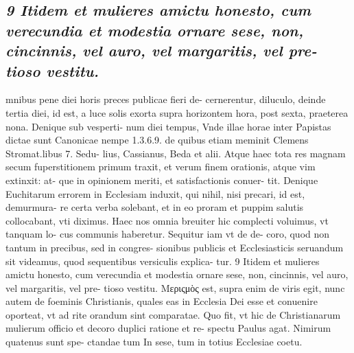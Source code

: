 \documentclass{article}
\begin{document}
\begin{pages}
\subsection*{\textit{9 Itidem et mulieres amictu honesto, cum verecundia et modestia ornare sese, non, cincinnis, vel auro, vel margaritis, vel pre- tioso vestitu.}}mnibus pene diei horis preces publicae fieri de- cernerentur, diluculo, deinde tertia diei, id est, a luce solis exorta supra horizontem hora, post sexta, praeterea nona. Denique sub vesperti- num diei tempus, Vnde illae horae inter Papistas dictae sunt Canonicae nempe 1.3.6.9. de quibus etiam meminit Clemens Stromat.libus 7. Sedu- lius, Cassianus, Beda et alii. Atque haec tota res magnam secum fuperstitionem primum traxit, et verum finem orationis, atque vim extinxit: at- que in opinionem meriti, et satisfactionis conuer- tit. Denique Euchitarum errorem in Ecclesiam induxit, qui nihil, nisi precari, id est, demurmura- re certa verba solebant, et in eo proram et puppim salutis collocabant, vti diximus. Haec nos omnia breuiter hic complecti voluimus, vt tanquam lo- cus communis haberetur. Sequitur iam vt de de- coro, quod non tantum in precibus, sed in congres- sionibus publicis et Ecclesiasticis seruandum sit videamus, quod sequentibus versiculis explica- tur. 9 Itidem et mulieres amictu honesto, cum verecundia et modestia ornare sese, non, cincinnis, vel auro, vel margaritis, vel pre- tioso vestitu. Μεριςμὸς est, supra enim de viris egit, nunc autem de foeminis Christianis, quales eas in Ecclesia Dei esse et conuenire oporteat, vt ad rite orandum sint comparatae. Quo fit, vt hic de Christianarum mulierum officio et decoro duplici ratione et re- spectu Paulus agat. Nimirum quatenus sunt spe- ctandae tum In sese, tum in totius Ecclesiae coetu.  \pend

\end{pages}
\end{document}
